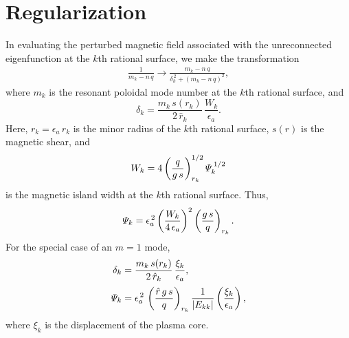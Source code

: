 \documentclass[12pt,prb,aps,notitlepage]{revtex4-1}
\begin{document}
\section{Regularization}
In evaluating the perturbed magnetic field associated with the unreconnected eigenfunction at the $k$th rational surface, we make the
transformation
\begin{align}
\frac{1}{m_k-n\,q} \rightarrow \frac{m_k-n\,q}{\delta_k^{\,2} + (m_k-n\,q)^2},
\end{align}
where $m_k$ is the resonant poloidal mode number at the $k$th rational surface, and
\begin{equation}
\delta_k = \frac{m_k\,s(r_k)}{2\,\hat{r}_k}\,\frac{W_k}{\epsilon_a}.
\end{equation}
Here, $r_k=\epsilon_a\,\hat{r}_k$ is the minor radius of the $k$th rational surface, $s(r)$ is the magnetic shear, and 
\begin{equation}
W_k = 4\left(\frac{q}{g\,s}\right)_{r_k}^{1/2}{\mit\Psi}_k^{\,1/2}
\end{equation}
is the magnetic island width at the $k$th rational surface. 
Thus, 
\begin{equation}
{\mit\Psi}_k= \epsilon_a^{\,2} \left(\frac{W_k}{4\,\epsilon_a}\right)^2\left(\frac{g\,s}{q}\right)_{r_k}.
\end{equation}
For the special case of an $m=1$ mode,
\begin{align}
\delta_k &= \frac{m_k\,s(r_k)}{2\,\hat{r}_k}\,\frac{\xi_k}{\epsilon_a},\\[0.5ex]
{\mit\Psi}_k &= \epsilon_a^{\,2}\,\left(\frac{\hat{r}\,g\,s}{q}\right)_{r_k}\frac{1}{|E_{kk}|} \left(\frac{\xi_k}{\epsilon_a}\right),
\end{align}
where $\xi_k$ is the displacement of the plasma core. 
\end{document}
